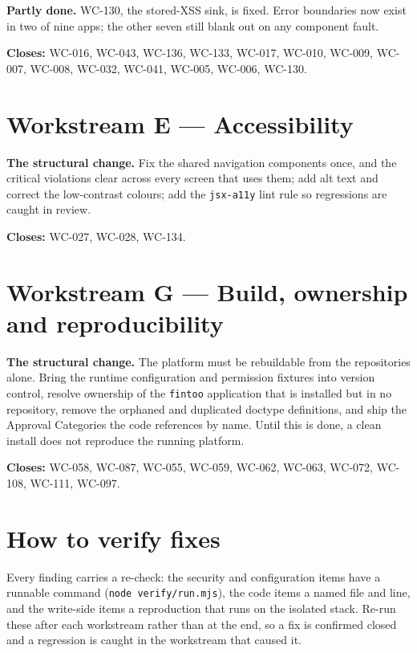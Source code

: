 \documentclass[11pt]{article}
\newcommand{\wc}[1]{\mbox{WC-#1}}
\begin{document}
\textbf{Partly done.} \wc{130}, the stored-XSS sink, is fixed. Error boundaries now exist in two of
nine apps; the other seven still blank out on any component fault.

\textbf{Closes:} \wc{016}, \wc{043}, \wc{136}, \wc{133}, \wc{017}, \wc{010}, \wc{009}, \wc{007},
\wc{008}, \wc{032}, \wc{041}, \wc{005}, \wc{006}, \wc{130}.

\section{Workstream E --- Accessibility}
\textbf{The structural change.} Fix the shared navigation components once, and the critical violations
clear across every screen that uses them; add alt text and correct the low-contrast colours; add the
\texttt{jsx-a11y} lint rule so regressions are caught in review.

\textbf{Closes:} \wc{027}, \wc{028}, \wc{134}.

\section{Workstream G --- Build, ownership and reproducibility}
\textbf{The structural change.} The platform must be rebuildable from the repositories alone. Bring the
runtime configuration and permission fixtures into version control, resolve ownership of the
\texttt{fintoo} application that is installed but in no repository, remove the orphaned and duplicated
doctype definitions, and ship the Approval Categories the code references by name. Until this is done,
a clean install does not reproduce the running platform.

\textbf{Closes:} \wc{058}, \wc{087}, \wc{055}, \wc{059}, \wc{062}, \wc{063}, \wc{072}, \wc{108},
\wc{111}, \wc{097}.

\section{How to verify fixes}
Every finding carries a re-check: the security and configuration items have a runnable command
(\texttt{node verify/run.mjs}), the code items a named file and line, and the write-side items a
reproduction that runs on the isolated stack. Re-run these after each workstream rather than at the
end, so a fix is confirmed closed and a regression is caught in the workstream that caused it.
\end{document}
